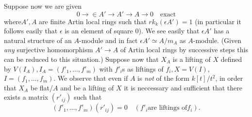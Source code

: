 {\begin{remark}\label{part1-rem6.1}%
Suppose now we are given 
$$
0\to \in A'\to A'\to A \to 0\quad\text{exact}
$$
where\pageoriginale $A', A$ are finite Artin local rings such that
$rk_k(\epsilon A')=1$ (in particular it follows easily that $\epsilon$
is an element of square $0$). We see easily that $\epsilon A'$ has a
natural structure of an $A$-module and in fact $\epsilon A'\simeq
A/m_A$ as $A$-module. (Given {\em any} surjective homomorphism $A'\to
A$ of Artin local rings by successive steps this can be reduced to
this situation.) Suppose now that $X_A$ is a lifting of $X$ defined by
$V(I_A), I_A=(f'_{1},\ldots,f'_{m})$ with $f'_i$s as liftings of $f_i,
X=V(I)$, $I=(f_1,\ldots,f_m)$. We observe that even if $A$ is {\em
not} of the form $k[t]/t^{2}$, in order that $X_A$ be flat/$A$ and be
a lifting of $X$ it is neccessary and sufficient that there exists a
matrix $(r'_{ij})$ such that 
$$
(f'_1,\ldots,f'_m)(r'_{ij})=0\quad (f'_i \text{are liftings of} f_i).
$$
\end{remark}

}
